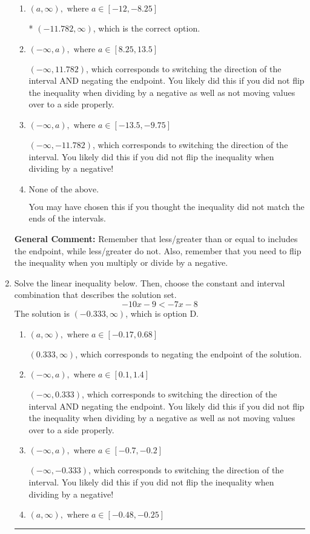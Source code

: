 \documentclass{extbook}[14pt]
\newcommand{\litem}[1]{\item #1

\rule{\textwidth}{0.4pt}}
\begin{document}
\begin{enumerate}
{\begin{enumerate}[label=\Alph*.]
 $(11.782, \infty)$, which corresponds to negating the endpoint of the solution.
\item \( (a, \infty), \text{ where } a \in [-12, -8.25] \)

* $(-11.782, \infty)$, which is the correct option.
\item \( (-\infty, a), \text{ where } a \in [8.25, 13.5] \)

 $(-\infty, 11.782)$, which corresponds to switching the direction of the interval AND negating the endpoint. You likely did this if you did not flip the inequality when dividing by a negative as well as not moving values over to a side properly.
\item \( (-\infty, a), \text{ where } a \in [-13.5, -9.75] \)

 $(-\infty, -11.782)$, which corresponds to switching the direction of the interval. You likely did this if you did not flip the inequality when dividing by a negative!
\item \( \text{None of the above}. \)

You may have chosen this if you thought the inequality did not match the ends of the intervals.
\end{enumerate}

\textbf{General Comment:} Remember that less/greater than or equal to includes the endpoint, while less/greater do not. Also, remember that you need to flip the inequality when you multiply or divide by a negative.
}
\litem{
Solve the linear inequality below. Then, choose the constant and interval combination that describes the solution set.
\[ -10x -9 < -7x -8 \]The solution is \( (-0.333, \infty) \), which is option D.\begin{enumerate}[label=\Alph*.]
\item \( (a, \infty), \text{ where } a \in [-0.17, 0.68] \)

 $(0.333, \infty)$, which corresponds to negating the endpoint of the solution.
\item \( (-\infty, a), \text{ where } a \in [0.1, 1.4] \)

 $(-\infty, 0.333)$, which corresponds to switching the direction of the interval AND negating the endpoint. You likely did this if you did not flip the inequality when dividing by a negative as well as not moving values over to a side properly.
\item \( (-\infty, a), \text{ where } a \in [-0.7, -0.2] \)

 $(-\infty, -0.333)$, which corresponds to switching the direction of the interval. You likely did this if you did not flip the inequality when dividing by a negative!
\item \( (a, \infty), \text{ where } a \in [-0.48, -0.25] \)


\end{enumerate}}
\end{enumerate}
\end{document}

